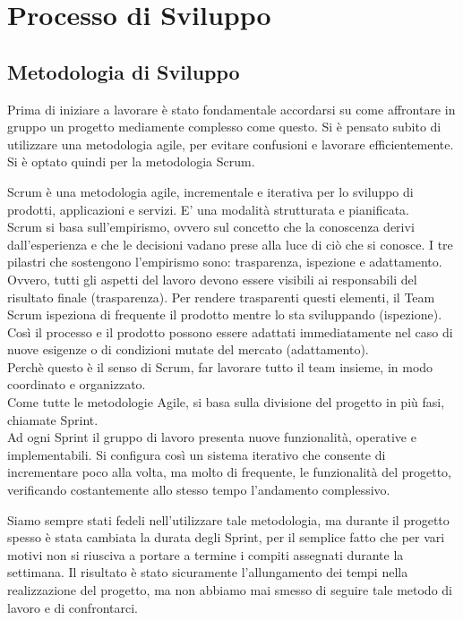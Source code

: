 \chapter{Processo di Sviluppo}


\section{Metodologia di Sviluppo}
Prima di iniziare a lavorare è stato fondamentale accordarsi su come affrontare in gruppo un progetto mediamente complesso come questo. Si è pensato subito di utilizzare una metodologia agile, per evitare confusioni e lavorare efficientemente. Si è optato quindi per la metodologia Scrum.\vspace{0.5cm}

    Scrum è una metodologia agile, incrementale e iterativa per lo sviluppo di prodotti, applicazioni e servizi. E' una modalità strutturata e pianificata.\\
    Scrum si basa sull’empirismo, ovvero sul concetto che la conoscenza derivi dall’esperienza e che le decisioni vadano prese alla luce di ciò che si conosce. I tre pilastri che sostengono l’empirismo sono: trasparenza, ispezione e adattamento.\\
    Ovvero, tutti gli aspetti del lavoro devono essere visibili ai responsabili del risultato finale (trasparenza). Per rendere trasparenti questi elementi, il Team Scrum ispeziona di frequente il prodotto mentre lo sta sviluppando (ispezione). Così il processo e il prodotto possono essere adattati immediatamente nel caso di nuove esigenze o di condizioni mutate del mercato (adattamento).\\ 
    Perchè questo è il senso di Scrum, far lavorare tutto il team insieme, in modo coordinato e organizzato.\\
    Come tutte le metodologie Agile, si basa sulla divisione del progetto in più fasi, chiamate Sprint.\\
Ad ogni Sprint il gruppo di lavoro presenta nuove funzionalità, operative e implementabili. Si configura così un sistema iterativo che consente di incrementare poco alla volta, ma molto di frequente, le funzionalità del progetto, verificando costantemente allo stesso tempo l'andamento complessivo.\vspace{0.5cm}

Siamo sempre stati fedeli nell'utilizzare tale metodologia, ma durante il progetto spesso è stata cambiata la durata degli Sprint, per il semplice fatto che per vari motivi non si riusciva a portare a termine i compiti assegnati durante la settimana. Il risultato è stato sicuramente l'allungamento dei tempi nella realizzazione del progetto, ma non abbiamo mai smesso di seguire tale metodo di lavoro e di confrontarci.

